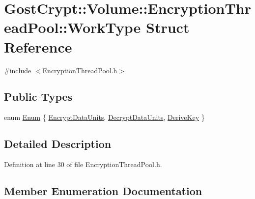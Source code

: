 \hypertarget{struct_gost_crypt_1_1_volume_1_1_encryption_thread_pool_1_1_work_type}{}\section{Gost\+Crypt\+:\+:Volume\+:\+:Encryption\+Thread\+Pool\+:\+:Work\+Type Struct Reference}
\label{struct_gost_crypt_1_1_volume_1_1_encryption_thread_pool_1_1_work_type}


{\ttfamily \#include $<$Encryption\+Thread\+Pool.\+h$>$}

\subsection*{Public Types}
\begin{DoxyCompactItemize}
\item 
enum \hyperlink{struct_gost_crypt_1_1_volume_1_1_encryption_thread_pool_1_1_work_type_ae8c867a2b992c79f01dcc50bab7a448e}{Enum} \{ \hyperlink{struct_gost_crypt_1_1_volume_1_1_encryption_thread_pool_1_1_work_type_ae8c867a2b992c79f01dcc50bab7a448eacb12e9c3944540b96f0f27c750ecdb58}{Encrypt\+Data\+Units}, 
\hyperlink{struct_gost_crypt_1_1_volume_1_1_encryption_thread_pool_1_1_work_type_ae8c867a2b992c79f01dcc50bab7a448eac03280089a4f1c906f966b3523b259a7}{Decrypt\+Data\+Units}, 
\hyperlink{struct_gost_crypt_1_1_volume_1_1_encryption_thread_pool_1_1_work_type_ae8c867a2b992c79f01dcc50bab7a448ea21a5355b708a52ba0ad771c4529c2a35}{Derive\+Key}
 \}
\end{DoxyCompactItemize}


\subsection{Detailed Description}


Definition at line 30 of file Encryption\+Thread\+Pool.\+h.



\subsection{Member Enumeration Documentation}
\mbox{\label{struct_gost_crypt_1_1_volume_1_1_encryption_thread_pool_1_1_work_type_ae8c867a2b992c79f01dcc50bab7a448e}} 
